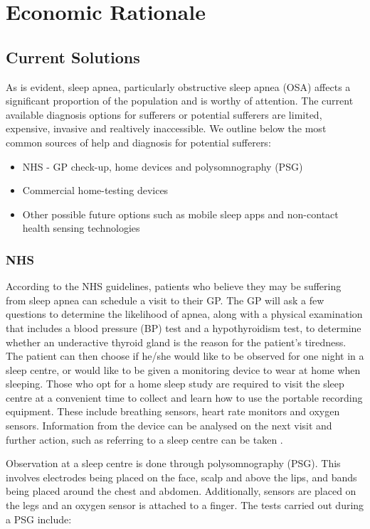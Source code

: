 \section{Economic Rationale}

\subsection{Current Solutions}

	As is evident, sleep apnea, particularly obstructive sleep apnea (OSA)
affects a significant proportion of the population and is worthy of
attention. The current available diagnosis options for sufferers or
potential sufferers are limited, expensive, invasive and realtively
inaccessible. We outline below the most common sources of help and
diagnosis for potential sufferers:
	\begin{itemize}
	\item NHS - GP check-up, home devices and polysomnography (PSG)
	\item Commercial home-testing devices
	\item Other possible future options such as mobile sleep apps and non-contact
health sensing technologies
	\end{itemize}

\subsubsection{NHS}

According to the NHS guidelines, patients who believe they may be suffering from sleep apnea can schedule a visit to their GP. The GP will ask a few questions to determine the likelihood of apnea, along with a physical examination that includes a blood pressure (BP) test and a hypothyroidism test, to determine whether an underactive thyroid gland is the reason for the patient's tiredness. The patient can then choose if he/she would like to be observed for one night in a sleep
centre, or would like to be given a monitoring device to wear at home when sleeping. Those who opt for a home sleep study are required to visit the sleep centre at a convenient time to collect and learn how to use the portable recording equipment. These include breathing sensors, heart rate monitors and oxygen sensors. Information from the device can be analysed on the next visit and further action, such as referring to a sleep centre can be taken \cite{nhsmain,nhsdiag}.

Observation at a sleep centre is done through polysomnography (PSG). This involves electrodes being placed on the face, scalp and above the lips, and bands being placed around the chest and abdomen. Additionally, sensors are placed on the legs and an oxygen sensor is attached to a finger. The tests carried out during a PSG include:

